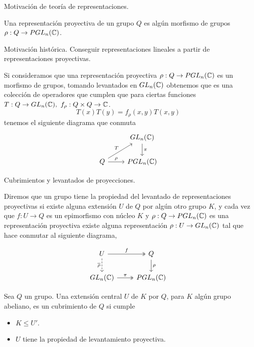 \documentclass[aspectratio=169, 9pt]{beamer}
\begin{document}
\begin{frame}[fragile]{Motivación de teoría de representaciones.}

Una \alert{representación proyectiva} de un grupo $Q$ es algún morfismo de grupos $\rho:Q \to PGL_n(\Bbb C)$. \pause
\medskip

\begin{exampleblock}{Motivación histórica.}
Conseguir representaciones lineales a partir de representaciones proyectivas.
\end{exampleblock}

\bigskip
\pause

Si consideramos que una representación proyectiva $\rho:Q \to PGL_n(\Bbb C)$ es un morfismo de grupos, tomando levantados en $GL_n(\Bbb C)$ obtenemos que es una colección de operadores que cumplen que para ciertas funciones $T:Q \to GL_n (\Bbb C),  \ f_\rho: Q \times Q \to \Bbb C$.
\begin{equation*}
	T(x)T(y) = f_\rho(x,y)T(x,y)
\end{equation*}
\pause tenemos el siguiente diagrama que conmuta
\begin{equation*}
	\begin{tikzcd}
	& GL_n(\Bbb C) \arrow[d, "\pi"] \\
	Q \arrow[ru, "T"] \arrow[r, "\rho"] & PGL_n(\Bbb C)                
	\end{tikzcd}
\end{equation*}
\end{frame}

\begin{frame}[fragile]{Cubrimientos y levantados de proyecciones.}

Diremos que un grupo tiene la \alert{propiedad del levantado de representaciones proyectivas} si existe alguna extensión $U$ de $Q$ por algún otro grupo $K$, y cada vez que $f:U \to Q$ es un epimorfismo con núcleo $K$ y $\rho:Q \to PGL_n(\Bbb C)$ es una representación proyectiva existe alguna representación $\rho:U \to GL_n(\Bbb C)$ tal que hace conmutar al siguiente diagrama,

\begin{equation*}
\begin{tikzcd}
U \arrow[r, "f", two heads] \arrow[d, "\overline \rho"', dashed] & Q \arrow[d, "\rho"] \\
GL_n(\Bbb C) \arrow[r, "\pi", two heads]                         & PGL_n(\Bbb C)      
\end{tikzcd}
\end{equation*}

\pause
\medskip


Sea $Q$ un grupo. Una extensión central $U$ de $K$ por $Q$, para $K$ algún grupo abeliano, es un \alert{cubrimiento} de $Q$ si cumple
\begin{itemize}
	\item $K \le U'$.
	\item $U$ tiene la propiedad de levantamiento proyectiva.
\end{itemize}
\end{frame}
\end{document}
